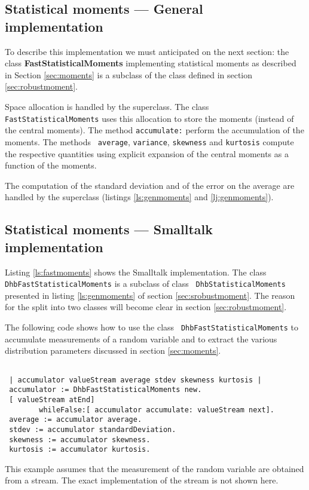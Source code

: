 \documentclass[twoside]{book}
\begin{document}
\subsection{Statistical moments --- General implementation}
 To describe this implementation
we must anticipated on the next section: the class {\bf
FastStatisticalMoments} implementing statistical moments as
described in Section \ref{sec:moments} is a subclass of the class
defined in section \ref{sec:robustmoment}.

Space allocation is handled by the superclass. The class {\tt
FastStatisticalMoments} uses this allocation to store the moments
(instead of the central moments). The method {\tt accumulate:}
perform the accumulation of the moments. The methods {\tt
average}, {\tt variance}, {\tt skewness} and {\tt kurtosis}
compute the respective quantities using explicit expansion of the
central moments as a function of the moments.

The computation of the standard deviation and of the error on the
average are handled by the superclass (\cf listings
\ref{ls:genmoments} and \ref{lj:genmoments}).


\subsection{Statistical moments --- Smalltalk implementation}
\label{sec:smoments}Listing \ref{ls:fastmoments} shows the
Smalltalk implementation. The class {\tt
DhbFastStatisticalMoments} is a subclass of class {\tt
DhbStatisticalMoments} presented in listing \ref{ls:genmoments} of
section \ref{sec:srobustmoment}. The reason for the split into two
classes will become clear in section \ref{sec:robustmoment}.

The following code shows how to use the class {\tt
DhbFastStatisticalMoments} to accumulate measurements of a random
variable and to extract the various distribution parameters
discussed in section \ref{sec:moments}.
\begin{codeExample}
\label{ex:smoments}
\begin{verbatim}

 | accumulator valueStream average stdev skewness kurtosis |
 accumulator := DhbFastStatisticalMoments new.
 [ valueStream atEnd]
        whileFalse:[ accumulator accumulate: valueStream next].
 average := accumulator average.
 stdev := accumulator standardDeviation.
 skewness := accumulator skewness.
 kurtosis := accumulator kurtosis.
\end{verbatim}
\end{codeExample}
This example assumes that the measurement of the random variable
are obtained from a stream. The exact implementation of the stream
is not shown here.
\end{document}
